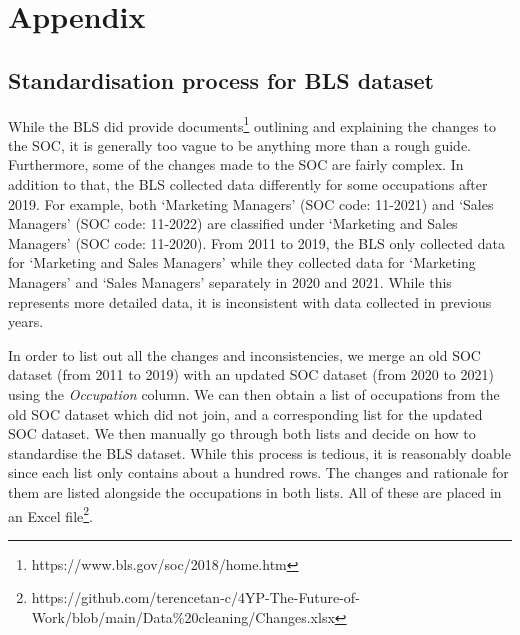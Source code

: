 \documentclass[11pt]{article}
\begin{document}
\section*{\hfill Appendix\hfill}

\subsection*{Standardisation process for BLS dataset}
While the BLS did provide documents\footnote{https://www.bls.gov/soc/2018/home.htm} outlining and explaining the changes to the SOC, it is generally too vague to be anything more than a rough guide. Furthermore, some of the changes made to the SOC are fairly complex. In addition to that, the BLS collected data differently for some occupations after 2019. For example, both `Marketing Managers' (SOC code: 11-2021) and `Sales Managers' (SOC code: 11-2022) are classified under `Marketing and Sales Managers' (SOC code: 11-2020). From 2011 to 2019, the BLS only collected data for `Marketing and Sales Managers' while they collected data for `Marketing Managers' and `Sales Managers' separately in 2020 and 2021. While this represents more detailed data, it is inconsistent with data collected in previous years.

In order to list out all the changes and inconsistencies, we merge an old SOC dataset (from 2011 to 2019) with an updated SOC dataset (from 2020 to 2021) using the \emph{Occupation} column. We can then obtain a list of occupations from the old SOC dataset which did not join, and a corresponding list for the updated SOC dataset. We then manually go through both lists and decide on how to standardise the BLS dataset. While this process is tedious, it is reasonably doable since each list only contains about a hundred rows. The changes and rationale for them are listed alongside the occupations in both lists. All of these are placed in an Excel file\footnote{https://github.com/terencetan-c/4YP-The-Future-of-Work/blob/main/Data\%20cleaning/Changes.xlsx}.
\end{document}
